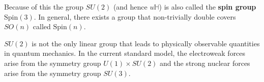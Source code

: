 Because of this the group $SU(2)$ (and hence $u \mathbb{H}$) is also called the \textbf{spin group} $\mathrm{Spin}(3)$. In general, there exists a group that non-trivially double covers $SO(n)$ called $\mathrm{Spin}(n)$.

$SU(2)$ is not the only linear group that leads to physically observable quantities in quantum mechanics. In the current standard model, the electroweak forces arise from the symmetry group $U(1) \times SU(2)$ and the strong nuclear forces arise from the symmetry group $SU(3)$.

%



